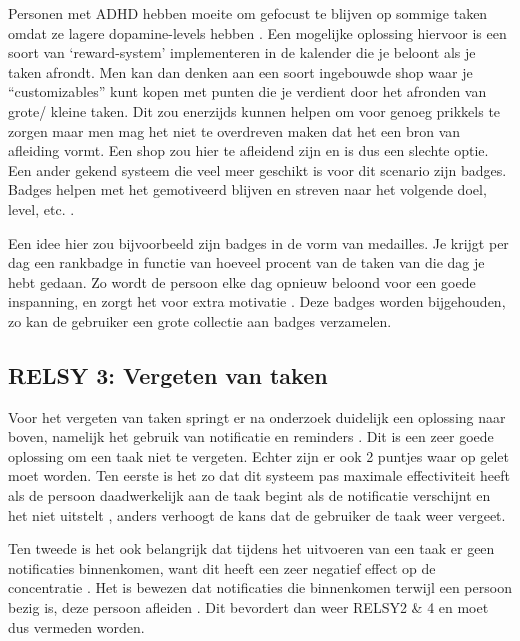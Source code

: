Personen met ADHD hebben moeite om gefocust te blijven op sommige taken omdat ze lagere dopamine-levels hebben \autocite{oades2008dopamine}. Een mogelijke oplossing hiervoor is een soort van ‘reward-system’ \autocite{volkow2011motivation} implementeren in de kalender die je beloont als je taken afrondt. Men kan dan denken aan een soort ingebouwde shop waar je “customizables” kunt kopen met punten die je verdient door het afronden van grote/ kleine taken. Dit zou enerzijds kunnen helpen om voor genoeg prikkels te zorgen maar men mag het niet te overdreven maken dat het een bron van afleiding vormt. Een shop zou hier te afleidend zijn en is dus een slechte optie. Een ander gekend systeem die veel meer geschikt is voor dit scenario zijn badges. Badges helpen met het gemotiveerd blijven en streven naar het volgende doel, level, etc. \autocite{shields2017digital}. \newline

Een idee hier zou bijvoorbeeld zijn badges in de vorm van medailles. Je krijgt per dag een rankbadge in functie van hoeveel procent van de taken van die dag je hebt gedaan. Zo wordt de persoon elke dag opnieuw beloond voor een goede inspanning, en zorgt het voor extra motivatie \autocite{ortega2019reward}. Deze badges worden bijgehouden, zo kan de gebruiker een grote collectie aan badges verzamelen.  

\subsection{RELSY 3: Vergeten van taken}
Voor het vergeten van taken springt er na onderzoek duidelijk een oplossing naar boven, namelijk het gebruik van notificatie en reminders \autocite{jamieson2022AppleTree}. Dit is een zeer goede oplossing om een taak niet te vergeten. Echter zijn er ook 2 puntjes waar op gelet moet worden. Ten eerste is het zo dat dit systeem pas maximale effectiviteit heeft als de persoon daadwerkelijk aan de taak begint als de notificatie verschijnt en het niet uitstelt \autocite{iqbal2008effects}, anders verhoogt de kans dat de gebruiker de taak weer vergeet.\newline

Ten tweede is het ook belangrijk dat tijdens het uitvoeren van een taak er geen notificaties binnenkomen, want dit heeft een zeer negatief effect op de concentratie \autocite{horvitz2001notification}. Het is bewezen dat notificaties die binnenkomen terwijl een persoon bezig is, deze persoon afleiden \autocite{iqbal2010notifications}. Dit bevordert dan weer RELSY2 & 4 en moet dus vermeden worden. \newline
  
